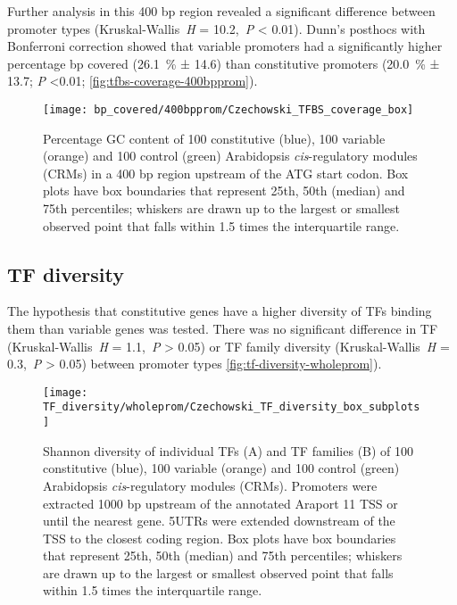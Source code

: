 \documentclass[../main.tex]{subfiles}
\begin{document}
Further analysis in this 400 bp region revealed a significant difference between promoter types (Kruskal\hyp{}Wallis~\textit{H} = 10.2,~\textit{P} \textless{} 0.01). Dunn's posthocs with Bonferroni correction showed that variable promoters had a significantly higher percentage bp covered (\SI{26.1}{\percent} ± 14.6) than constitutive promoters (\SI{20.0}{\percent} ± 13.7; \textit{P} \textless 0.01; \autoref{fig:tfbs-coverage-400bpprom}).

\begin{figure}[hbt!]
	\begin{center}
		\capstart
		\texttt{[image: bp\_covered/400bpprom/Czechowski\_TFBS\_coverage\_box]}
		\caption{
			Percentage GC content of 100 constitutive (blue), 100 variable (orange) and 100 control (green) Arabidopsis \textit{cis}\hyp{}regulatory modules (CRMs) in a 400 bp region upstream of the ATG start codon.
			Box plots have box boundaries that represent 25th, 50th (median) and 75th percentiles; whiskers are drawn up to the largest or smallest observed point that falls within 1.5 times the interquartile range.
			\label{fig:tfbs-coverage-400bpprom}
		}
	\end{center}
\end{figure}

\subsection{TF diversity}
The hypothesis that constitutive genes have a higher diversity of TFs binding them than variable genes was tested.
There was no significant difference in TF (Kruskal\hyp{}Wallis~\textit{H} = 1.1,~\textit{P} \textgreater{} 0.05) or TF family diversity (Kruskal\hyp{}Wallis~\textit{H} = 0.3,~\textit{P} \textgreater{} 0.05) between promoter types \autoref{fig:tf-diversity-wholeprom}).

\begin{figure}[hbt!]
	\begin{center}
		\capstart
		\texttt{[image: TF\_diversity/wholeprom/Czechowski\_TF\_diversity\_box\_subplots]}
		\caption{
			Shannon diversity of individual TFs (A) and TF families (B) of 100 constitutive (blue), 100 variable (orange) and 100 control (green) Arabidopsis \textit{cis}\hyp{}regulatory modules (CRMs).
			Promoters were extracted 1000 bp upstream of the annotated Araport 11 \autocite{chengAraport11CompleteReannotation2017} TSS or until the nearest gene.
			5UTRs were extended downstream of the TSS to the closest coding region.  Box plots have box boundaries that represent 25th, 50th (median) and 75th percentiles; whiskers are drawn up to the largest or smallest observed point that falls within 1.5 times the interquartile range.			
			\label{fig:tf-diversity-wholeprom}
		}
	\end{center}
\end{figure}
\end{document}
